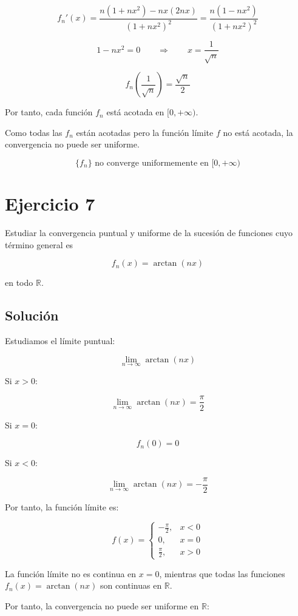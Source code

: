 \documentclass[fleqn]{article}
\begin{document}
	\[
	f_n'(x)
	=
	\frac{
	n(1+nx^2)-nx(2nx)
	}{
	(1+nx^2)^2
	}
	=
	\frac{
	n(1-nx^2)
	}{
	(1+nx^2)^2
	}
	\]

	\[
	1-nx^2=0
	\qquad\Longrightarrow\qquad
	x=\frac{1}{\sqrt{n}}
	\]

	\[
	f_n\left(\frac{1}{\sqrt{n}}\right)
	=
	\frac{\sqrt{n}}{2}
	\]

	Por tanto, cada función $f_n$ está acotada en $[0,+\infty)$.

	Como todas las $f_n$ están acotadas pero la función límite $f$ no está acotada, la convergencia no puede ser uniforme.

	\[
	\boxed{
	\{f_n\}\text{ no converge uniformemente en }[0,+\infty)
	}
	\]

\section{Ejercicio 7}
	Estudiar la convergencia puntual y uniforme de la sucesión de funciones cuyo término general es

	\[
	f_n(x)=\arctan(nx)
	\]

	en todo $\mathbb{R}$.

	\subsection{Solución}

	Estudiamos el límite puntual:

	\[
	\lim_{n\to\infty}\arctan(nx)
	\]

	Si $x>0$:

	\[
	\lim_{n\to\infty}\arctan(nx)
	=
	\frac{\pi}{2}
	\]

	Si $x=0$:

	\[
	f_n(0)=0
	\]

	Si $x<0$:

	\[
	\lim_{n\to\infty}\arctan(nx)
	=
	-\frac{\pi}{2}
	\]

	Por tanto, la función límite es:

	\[
	f(x)=
	\begin{cases}
	-\frac{\pi}{2}, & x<0 \\[1mm]
	0, & x=0 \\[1mm]
	\frac{\pi}{2}, & x>0
	\end{cases}
	\]

	La función límite no es continua en $x=0$, mientras que todas las funciones
	$f_n(x)=\arctan(nx)$ son continuas en $\mathbb{R}$.

	Por tanto, la convergencia no puede ser uniforme en $\mathbb{R}$:
\end{document}
